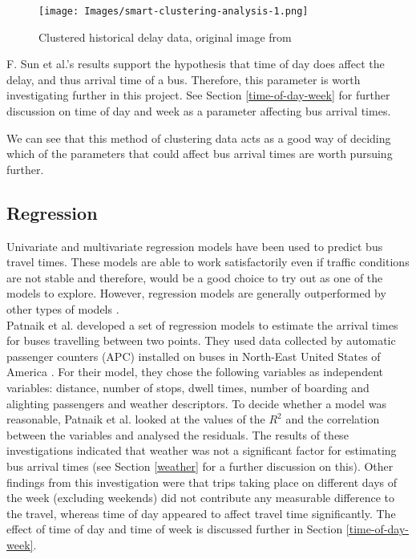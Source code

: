 \begin{figure}[H]
\begin{center}
    \texttt{[image: Images/smart-clustering-analysis-1.png]}
    \caption{Clustered historical delay data, original image from \cite{smart-public-transport}}
    \label{fig:clustered-historical-data}
\end{center}
\end{figure}

F. Sun et al.'s results support the hypothesis that time of day does affect the delay, and thus arrival time of a bus. Therefore, this parameter is worth investigating further in this project. See Section \ref{time-of-day-week} for further discussion on time of day and week as a parameter affecting bus arrival times. 

We can see that this method of clustering data acts as a good way of deciding which of the parameters that could affect bus arrival times are worth pursuing further. 

\subsection{Regression}

Univariate and multivariate regression models have been used to predict bus travel times. These models are able to work satisfactorily even if traffic conditions are not stable and therefore, would be a good choice to try out as one of the models to explore. However, regression models are generally outperformed by other types of models \cite{dynamic-gps}.\\

Patnaik et al. developed a set of regression models to estimate the arrival times for buses travelling between two points. They used data collected by automatic passenger counters (APC) installed on buses in North-East United States of America \cite{apc-estimation}. For their model, they chose the following variables as independent variables: distance, number of stops, dwell times, number of boarding and alighting passengers and weather descriptors. To decide whether a model was reasonable, Patnaik et al. looked at the values of the $R^2$ and the correlation between the variables and analysed the residuals. The results of these investigations indicated that weather was not a significant factor for estimating bus arrival times (see Section \ref{weather} for a further discussion on this). Other findings from this investigation were that trips taking place on different days of the week (excluding weekends) did not contribute any measurable difference to the travel, whereas time of day appeared to affect travel time significantly. The effect of time of day and time of week is discussed further in Section \ref{time-of-day-week}.

